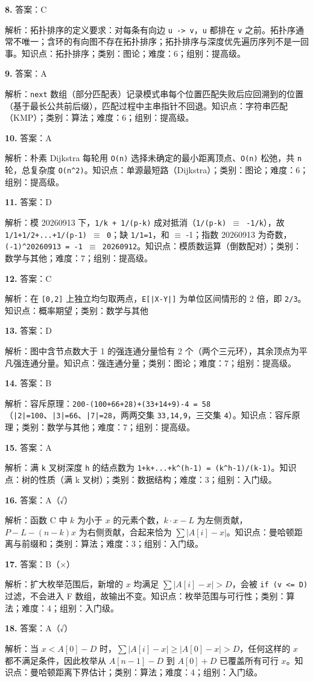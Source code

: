 \documentclass[a4paper]{ctexart}
\newcommand{\ans}[2]{\noindent\textbf{#1} \quad 答案：#2\par}
\newcommand{\expn}[1]{\hspace*{1.5em} 解析：#1\par}
\begin{document}
\ans{8.}{C}
\expn{拓扑排序的定义要求：对每条有向边 \texttt{u -> v}，\texttt{u} 都排在 \texttt{v} 之前。拓扑序通常不唯一；含环的有向图不存在拓扑排序；拓扑排序与深度优先遍历序列不是一回事。\quad 知识点：拓扑排序；类别：图论；难度：6；组别：提高级。}

\ans{9.}{A}
\expn{\texttt{next} 数组（部分匹配表）记录模式串每个位置匹配失败后应回溯到的位置（基于最长公共前后缀），匹配过程中主串指针不回退。\quad 知识点：字符串匹配（KMP）；类别：算法；难度：6；组别：提高级。}

\ans{10.}{A}
\expn{朴素 Dijkstra 每轮用 \texttt{O(n)} 选择未确定的最小距离顶点、\texttt{O(n)} 松弛，共 \texttt{n} 轮，总复杂度 \texttt{O(n\^{}2)}。\quad 知识点：单源最短路（Dijkstra）；类别：图论；难度：6；组别：提高级。}

\ans{11.}{D}
\expn{模 20260913 下，\texttt{1/k + 1/(p-k)} 成对抵消（\texttt{1/(p-k) $\equiv$ -1/k}），故 \texttt{1/1+1/2+...+1/(p-1) $\equiv$ 0}；缺 \texttt{1/1=1}，和 $\equiv$ -1；指数 20260913 为奇数，\texttt{(-1)\^{}20260913 = -1 $\equiv$ 20260912}。\quad 知识点：模质数运算（倒数配对）；类别：数学与其他；难度：7；组别：提高级。}

\ans{12.}{C}
\expn{在 \texttt{[0,2]} 上独立均匀取两点，\texttt{E[|X-Y|]} 为单位区间情形的 2 倍，即 \texttt{2/3}。\quad 知识点：概率期望；类别：数学与其他}

\ans{13.}{D}
\expn{图中含节点数大于 1 的强连通分量恰有 2 个（两个三元环），其余顶点为平凡强连通分量。\quad 知识点：强连通分量；类别：图论；难度：7；组别：提高级。}

\ans{14.}{B}
\expn{容斥原理：\texttt{200-(100+66+28)+(33+14+9)-4 = 58}（\texttt{|2|=100}、\texttt{|3|=66}、\texttt{|7|=28}，两两交集 \texttt{33,14,9}，三交集 \texttt{4}）。\quad 知识点：容斥原理；类别：数学与其他；难度：7；组别：提高级。}

\ans{15.}{A}
\expn{满 \texttt{k} 叉树深度 \texttt{h} 的结点数为 \texttt{1+k+...+k\^{}(h-1) = (k\^{}h-1)/(k-1)}。\quad 知识点：树的性质（满 k 叉树）；类别：数据结构；难度：3；组别：入门级。}

\ans{16.}{A（√）}
\expn{函数 C 中 $k$ 为小于 $x$ 的元素个数，$k\cdot x-L$ 为左侧贡献，$P-L-(n-k)x$ 为右侧贡献，合起来恰为 $\sum|A[i]-x|$。\quad 知识点：曼哈顿距离与前缀和；类别：算法；难度：3；组别：入门级。}

\ans{17.}{B（×）}
\expn{扩大枚举范围后，新增的 $x$ 均满足 $\sum|A[i]-x|>D$，会被 \texttt{if (v <= D)} 过滤，不会进入 F 数组，故输出不变。\quad 知识点：枚举范围与可行性；类别：算法；难度：4；组别：入门级。}

\ans{18.}{A（√）}
\expn{当 $x<A[0]-D$ 时，$\sum|A[i]-x|\ge |A[0]-x|>D$，任何这样的 $x$ 都不满足条件，因此枚举从 $A[n-1]-D$ 到 $A[0]+D$ 已覆盖所有可行 $x$。\quad 知识点：曼哈顿距离下界估计；类别：算法；难度：4；组别：入门级。}
\end{document}

